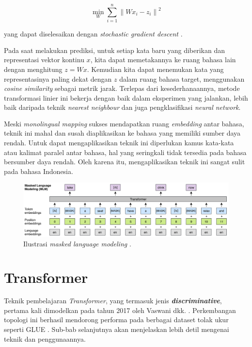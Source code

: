 \documentclass[conference]{IEEEtran}
\begin{document}
	\begin{equation}
	    \min_{W}\sum_{i=1}^{n}\left \| Wx_i-z_i \right \|^2
	    \label{eq:2}
	\end{equation}

	yang dapat diselesaikan dengan \textit{stochastic gradient descent} \cite{b12}.

	Pada saat melakukan prediksi, untuk setiap kata baru yang diberikan dan representasi vektor kontinu \(x\), kita dapat memetakannya ke ruang bahasa lain dengan menghitung \(z = W x\). Kemudian kita dapat menemukan kata yang representasinya paling dekat dengan \(z\) dalam ruang bahasa target, menggunakan \textit{cosine similarity} sebagai metrik jarak. Terlepas dari kesederhanaannya, metode transformasi linier ini bekerja dengan baik dalam eksperimen yang \cite{b12} jalankan, lebih baik daripada teknik \textit{nearest neighbour} dan juga pengklasifikasi \textit{neural network}.

	Meski \textit{monolingual mapping} sukses mendapatkan ruang \textit{embedding} antar bahasa, teknik ini mahal dan susah diaplikasikan ke bahasa yang memiliki sumber daya rendah. Untuk dapat mengaplikasikan teknik ini diperlukan kamus kata-kata atau kalimat paralel antar bahasa, hal yang seringkali tidak tersedia pada bahasa bersumber daya rendah. Oleh karena itu, mengaplikasikan teknik ini sangat sulit pada bahasa Indonesia. 

\begin{figure}[htb]
    \centerline{
    \includegraphics[width=1\textwidth]{resources/ilustrasi-mlm.png}}
    \caption{Ilustrasi \textit{masked language modeling} \cite{b2}.}
    \label{fig:ilustrasi_mlm}
\end{figure}

\section{Transformer}
Teknik pembelajaran \textit{Transformer}, yang termasuk jenis \textbf{\textit{discriminative}}, pertama kali dimodelkan pada tahun 2017 oleh Vaswani dkk. \cite{b14}. Perkembangan topologi ini berhasil mendorong performa pada berbagai dataset tolak ukur seperti GLUE \cite{b15}. Sub-bab selanjutnya akan menjelaskan lebih detil mengenai teknik dan penggunaannya.
\end{document}

